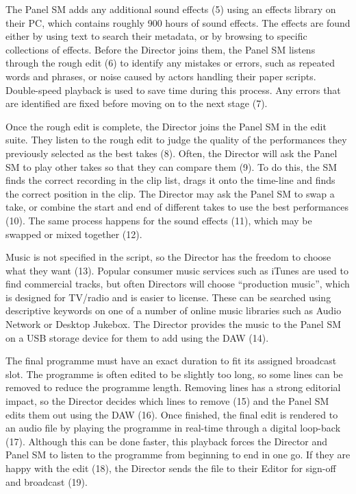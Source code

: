 The Panel SM adds any additional sound effects (5) using an effects library on their PC, which contains roughly 900
hours of sound effects.  The effects are found either by using text to search their metadata, or by browsing to
specific collections of effects.  Before the Director joins them, the Panel SM listens through the rough edit (6) to
identify any mistakes or errors, such as repeated words and phrases, or noise caused by actors handling their paper
scripts.  Double-speed playback is used to save time during this process. Any errors that are identified are fixed
before moving on to the next stage (7).

Once the rough edit is complete, the Director joins the Panel SM in the edit suite. They listen to the rough edit to
judge the quality of the performances they previously selected as the best takes (8).  Often, the Director will ask the
Panel SM to play other takes so that they can compare them (9).  To do this, the SM finds the correct recording in the
clip list, drags it onto the time-line and finds the correct position in the clip.  The Director may ask the Panel SM
to swap a take, or combine the start and end of different takes to use the best performances (10).  The same process
happens for the sound effects (11), which may be swapped or mixed together (12).

Music is not specified in the script, so the Director has the freedom to choose what they want (13). Popular consumer
music services such as iTunes are used to find commercial tracks, but often Directors will choose ``production music'',
which is designed for TV/radio and is easier to license. These can be searched using descriptive keywords on one of a
number of online music libraries such as Audio Network or Desktop Jukebox.  The Director provides the music to the
Panel SM on a USB storage device for them to add using the DAW (14).

The final programme must have an exact duration to fit its assigned broadcast slot. The programme is often edited to be
slightly too long, so some lines can be removed to reduce the programme length. Removing lines has a strong editorial
impact, so the Director decides which lines to remove (15) and the Panel SM edits them out using the DAW (16).  Once
finished, the final edit is rendered to an audio file by playing the programme in real-time through a digital loop-back
(17). Although this can be done faster, this playback forces the Director and Panel SM to listen to the programme from
beginning to end in one go. If they are happy with the edit (18), the Director sends the file to their Editor for
sign-off and broadcast (19).

